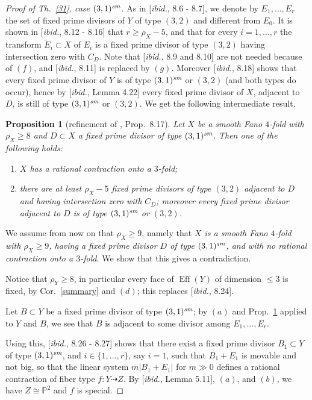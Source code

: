\documentclass[a4paper,12pt]{amsart}
\newtheorem{proposition}[thm]{Proposition}
\theoremstyle{definition}
\numberwithin{figure}{section}
\numberwithin{table}{section}
\newcommand{\w}{\widetilde}
\newcommand{\pr}{\mathbb{P}}
\newcommand{\Eff}{\operatorname{Eff}}
\newcommand{\sm}{\text{\it sm}}
\begin{document}
\begin{proof}[Proof of Th.~\ref{31}, case $(3,1)^{\sm}$]
    As in [\emph{ibid.}, 8.6 - 8.7], we denote by $E_1,\dotsc,E_r$ the set of fixed prime divisors of $Y$ of type $(3,2)$ and different from $E_0$.
It is shown in [\emph{ibid.}, 8.12 - 8.16] that $r\geq \rho_X-5$, and that  for every $i=1,\dotsc,r$ the transform $\w{E}_i\subset X$ of $E_i$ is a fixed prime divisor of type $(3,2)$ having intersection zero with $C_D$.
 Note that  [\emph{ibid.}, 8.9 and 8.10] are not needed because of $(f)$, and [\emph{ibid.}, 8.11] is replaced by $(g)$. Moreover [\emph{ibid.}, 8.18] shows that every fixed prime divisor of $Y$ is of type $(3,1)^{\sm}$ or $(3,2)$ (and both types do occur), hence by  [\emph{ibid.}, Lemma 4.22] every fixed prime divisor of $X$, adjacent to $D$, is still  of type $(3,1)^{\sm}$ or $(3,2)$. We get the following intermediate result.
 \begin{proposition}[refinement of \cite{small}, Prop.~8.17]\label{vivina}
Let $X$ be a smooth Fano $4$-fold with $\rho_X\geq 8$ and $D\subset X$ a fixed prime divisor of type $(3,1)^{\sm}$. Then  one of the following holds:
  \begin{enumerate}[$(i)$]
  \item $X$ has a rational contraction onto a $3$-fold;
    \item there are at least $\rho_X-5$ fixed prime divisors of type $(3,2)$ adjacent to $D$ and having intersection zero with $C_D$; moreover every fixed prime divisor adjacent to $D$ is of type $(3,1)^{\sm}$ or $(3,2)$.
    \end{enumerate}
\end{proposition}

We assume from now on that $\rho_X\geq 9$, namely that \emph{$X$ is a smooth Fano $4$-fold with $\rho_X\geq 9$, having a fixed prime divisor $D$ of type $(3,1)^{\sm}$, and
  with no rational contraction onto a $3$-fold.} We show that this gives a contradiction.

Notice that $\rho_Y\geq 8$, in particular
every face of $\Eff(Y)$ of dimension $\leq 3$ is fixed, by
Cor.~\ref{summary} and $(d)$; this replaces [\emph{ibid.}, 8.24].

Let $B\subset Y$ be a 
  fixed prime divisor
 of type $(3,1)^{\sm}$; by $(a)$  and Prop.~\ref{vivina} applied to $Y$ and $B$,  we see that 
 $B$ is adjacent to some divisor among $E_1,\dotsc,E_r$.

 Using this,  [\emph{ibid.}, 8.26 - 8.27]
 shows that there exist a fixed prime divisor $B_1\subset Y$ of type $(3,1)^{\sm}$, and $i\in\{1,\dotsc,r\}$, say $i=1$, such that $B_1+E_1$ is movable and not big, so that the linear system $m|B_1+E_1|$ for $m\gg 0$ defines a rational contraction of fiber type $f\colon Y\dasharrow Z$. By [\emph{ibid.}, Lemma 5.11], $(a)$, and $(b)$, we have $Z\cong\pr^2$ and $f$ is special. 


\end{proof}
\end{document}
